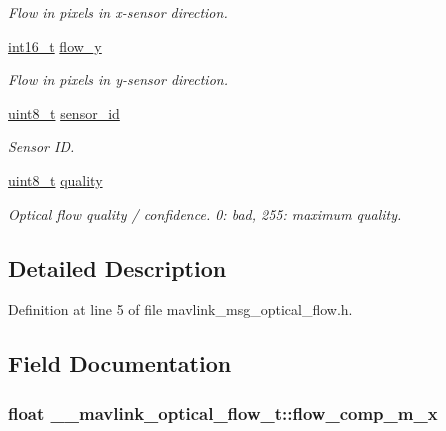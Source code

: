 \begin{DoxyCompactItemize}
\begin{DoxyCompactList}\small\item\em Flow in pixels in x-\/sensor direction. \end{DoxyCompactList}\item 
\hyperlink{stdint_8h_aa343fa3b3d06292b959ffdd4c4703b06}{int16\-\_\-t} \hyperlink{struct____mavlink__optical__flow__t_aaf2884728b3ae06ec464c9cf2f8ce1c2}{flow\-\_\-y}
\begin{DoxyCompactList}\small\item\em Flow in pixels in y-\/sensor direction. \end{DoxyCompactList}\item 
\hyperlink{stdint_8h_aba7bc1797add20fe3efdf37ced1182c5}{uint8\-\_\-t} \hyperlink{struct____mavlink__optical__flow__t_a196e345c474b8fc63570ebad5f947544}{sensor\-\_\-id}
\begin{DoxyCompactList}\small\item\em Sensor I\-D. \end{DoxyCompactList}\item 
\hyperlink{stdint_8h_aba7bc1797add20fe3efdf37ced1182c5}{uint8\-\_\-t} \hyperlink{struct____mavlink__optical__flow__t_a3efb901fe9c47c88f90ddfb73d76f542}{quality}
\begin{DoxyCompactList}\small\item\em Optical flow quality / confidence. 0\-: bad, 255\-: maximum quality. \end{DoxyCompactList}\end{DoxyCompactItemize}


\subsection{Detailed Description}


Definition at line 5 of file mavlink\-\_\-msg\-\_\-optical\-\_\-flow.\-h.



\subsection{Field Documentation}
\hypertarget{struct____mavlink__optical__flow__t_ab8fab603e276328627e4d96cc4f8b086}{
\subsubsection[{flow\-\_\-comp\-\_\-m\-\_\-x}]{\setlength{\rightskip}{0pt plus 5cm}float \-\_\-\-\_\-mavlink\-\_\-optical\-\_\-flow\-\_\-t\-::flow\-\_\-comp\-\_\-m\-\_\-x}}\label{struct____mavlink__optical__flow__t_ab8fab603e276328627e4d96cc4f8b086}


